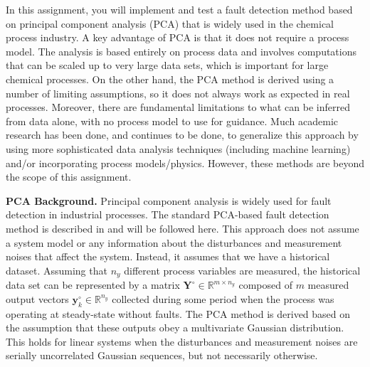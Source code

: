 \documentclass[14pt]{article}
\theoremstyle{definition}
\newcommand{\0}{\ensuremath{\mathbf{0}}}
\newcommand{\bs}[1]{\ensuremath{\mathbf{#1}}}
\begin{document}
In this assignment, you will implement and test a fault detection method based on principal component analysis (PCA) that is widely used in the chemical process industry. A key advantage of PCA is that it does not require a process model. The analysis is based entirely on process data and involves computations that can be scaled up to very large data sets, which is important for large chemical processes. On the other hand, the PCA method is derived using a number of limiting assumptions, so it does not always work as expected in real processes. Moreover, there are fundamental limitations to what can be inferred from data alone, with no process model to use for guidance. Much academic research has been done, and continues to be done, to generalize this approach by using more sophisticated data analysis techniques (including machine learning) and/or incorporating process models/physics. However, these methods are beyond the scope of this assignment.

\vspace{\baselineskip}
\noindent
{\bfseries PCA Background.} Principal component analysis is widely used for fault detection in industrial processes. The standard PCA-based fault detection method is described in \cite{chiang2000} and will be followed here. This approach does not assume a system model or any information about the disturbances and measurement noises that affect the system. Instead, it assumes that we have a historical dataset. Assuming that $n_y$ different process variables are measured, the historical data set can be represented by a matrix $\bs Y^{\circ} \in \mathbb{R}^{m\times n_y}$ composed of $m$ measured output vectors $\bs y_k^{\circ}\in \mathbb{R}^{n_y}$ collected during some period when the process was operating at steady-state without faults. The PCA method is derived based on the assumption that these outputs obey a multivariate Gaussian distribution. This holds for linear systems when the disturbances and measurement noises are serially uncorrelated Gaussian sequences, but not necessarily otherwise.
\end{document}
